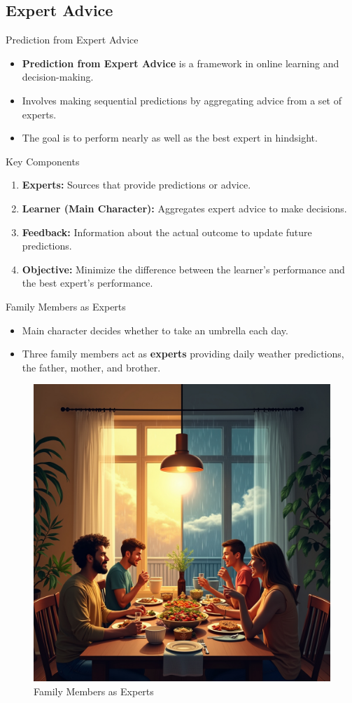 \documentclass{beamer}
\begin{document}
\subsection{Expert Advice}
\begin{frame}{Prediction from Expert Advice}
    \begin{itemize}
        \item \textbf{Prediction from Expert Advice} is a framework in online learning and decision-making.
        \item Involves making sequential predictions by aggregating advice from a set of experts.
        \item The goal is to perform nearly as well as the best expert in hindsight.
    \end{itemize}
\end{frame}

\begin{frame}{Key Components}
    \begin{enumerate}
        \item \textbf{Experts:} Sources that provide predictions or advice.
        \item \textbf{Learner (Main Character):} Aggregates expert advice to make decisions.
        \item \textbf{Feedback:} Information about the actual outcome to update future predictions.
        \item \textbf{Objective:} Minimize the difference between the learner's performance and the best expert's performance.
    \end{enumerate}
\end{frame}

\begin{frame}{Family Members as Experts}
    \begin{itemize}
        \item Main character decides whether to take an umbrella each day.
        \item Three family members act as \textbf{experts} providing daily weather predictions, the father, mother, and brother.
    \end{itemize}
    \begin{figure}
        \centering
        \includegraphics[width=0.4\linewidth]{images/openart-image_7K5I2JtA_1735594988581_raw.jpg}
        \caption{Family Members as Experts}
    \end{figure}
\end{frame}
\end{document}
